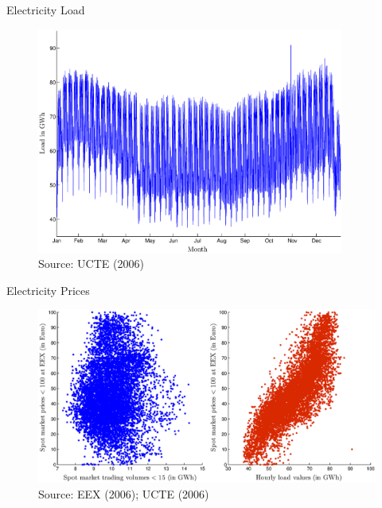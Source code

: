 
\begin{frame} {Electricity Load}
					
\begin{figure}[h]
\centering
\includegraphics[width=0.9\textwidth, angle=0]{loadvalues}
    \label{fig:load}   
\\ 
\vspace{0.1cm}
\scriptsize Source: UCTE (2006)           
\end{figure}
\end{frame}

\begin{frame} {Electricity Prices}				
\begin{figure}[h]
\centering
\includegraphics[width=1.0\textwidth, angle=0]{pricequant}
    \label{fig:load} 
\\ 
\vspace{0.1cm}
\scriptsize Source: EEX (2006); UCTE (2006)           
\end{figure}
\end{frame}

